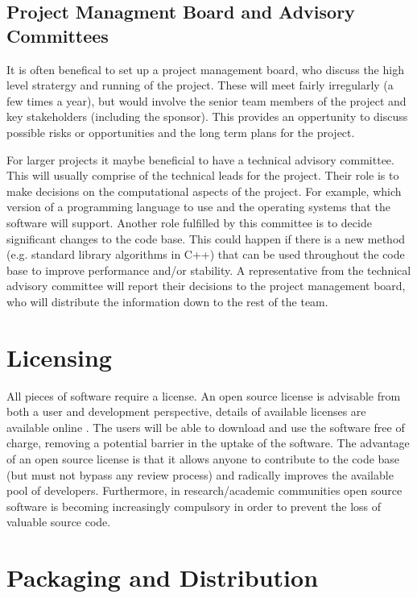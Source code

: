 \documentclass[jnr]{iosart2x}
\begin{document}
\subsection{Project Managment Board and Advisory Committees}\label{PM big}

It is often benefical to set up a project management board, who discuss the high level stratergy and running of the project.
These will meet fairly irregularly (a few times a year), but would involve the senior team members of the project and key stakeholders (including the sponsor).
This provides an oppertunity to discuss possible risks or opportunities and the long term plans for the project.

For larger projects it maybe beneficial to have a technical advisory committee.
This will usually comprise of the technical leads for the project.
Their role is to make decisions on the computational aspects of the project.
For example, which version of a programming language to use and the operating systems that the software will support.
Another role fulfilled by this committee is to decide significant changes to the code base.
This could happen if there is a new method (e.g. standard library algorithms in C++) that can be used throughout the code base to improve performance and/or stability.
A representative from the technical advisory committee will report their decisions to the project management board, who will distribute the information down to the rest of the team.

\section{Licensing}
\label{Licensing}

All pieces of software require a license.
An open source license is advisable from both a user and development perspective, details of available licenses are available online \cite{OSI_Licenses}.
The users will be able to download and use the software free of charge, removing a potential barrier in the uptake of the software.
The advantage of an open source license is that it allows anyone to contribute to the code base (but must not bypass any review process) and radically improves the available pool of developers.
Furthermore, in research/academic communities open source software is becoming increasingly compulsory in order to prevent the loss of valuable source code.

\section{Packaging and Distribution}
\label{Packaging and Distribution}
\end{document}
